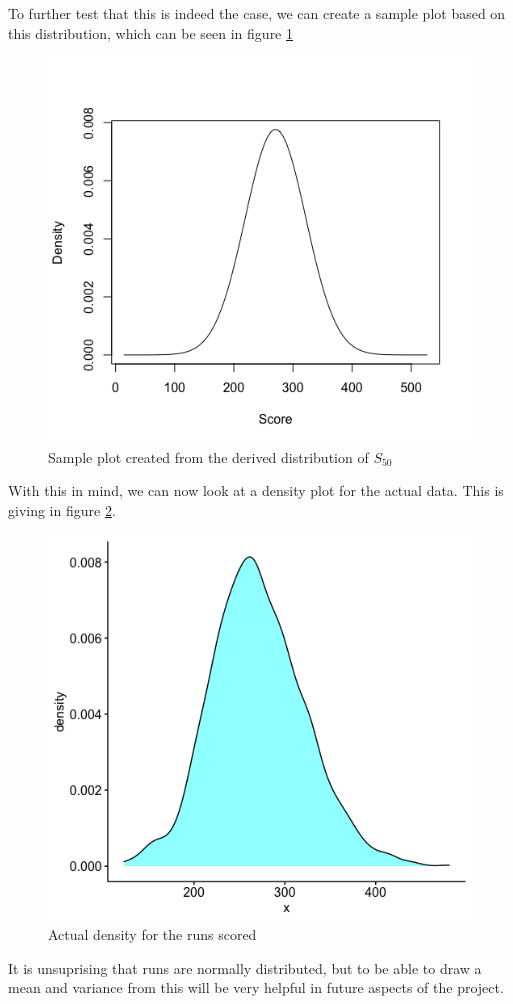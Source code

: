 To further test that this is indeed the case, we can create a sample plot based on this distribution, which can be seen in figure \ref{samplenorm}

\begin{figure}
    \label{samplenorm}
    \centering
    \includegraphics[scale=0.5]{figures/samplenorm.png}
    \caption{Sample plot created from the derived distribution of $S_{50}$}
\end{figure}

With this in mind, we can now look at a density plot for the actual data. This is giving in figure \ref{runsdens}.

\begin{figure}
    \label{runsdens}
    \centering
    \includegraphics[scale=0.45]{figures/runsdensity.png}
    \caption{Actual density for the runs scored}
\end{figure}

It is unsuprising that runs are normally distributed, but to be able to draw a mean and variance from this will be very helpful in future aspects of the project.